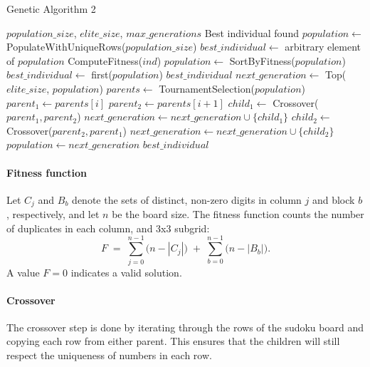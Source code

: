 \begin{algorithm}[H]
\caption{Genetic Algorithm 2}\label{alg:impl-2}
\begin{algorithmic}
\Require $population\_size$, $elite\_size$, $max\_generations$
\Ensure Best individual found
\State $population \gets$ PopulateWithUniqueRows($population\_size$)
\State $best\_individual \gets$ arbitrary element of $population$
    \State ComputeFitness($ind$)
  \EndFor
  \State $population \gets$ SortByFitness($population$) 
    \State $best\_individual \gets$ first($population$)
  \EndIf
    \State \Return $best\_individual$
  \EndIf
  \State $next\_generation \gets$ Top($elite\_size$, $population$)
  \State $parents \gets$ TournamentSelection($population$)
    \State $parent_1 \gets parents[i]$
    \State $parent_2 \gets parents[i+1]$
    \State $child_1 \gets$ Crossover($parent_1, parent_2$)
    \State $next\_generation \gets next\_generation \cup \{child_1\}$
      \State $child_2 \gets$ Crossover($parent_2, parent_1$)
      \State $next\_generation \gets next\_generation \cup \{child_2\}$
    \EndIf
  \EndFor
  \State $population \gets next\_generation$
\EndFor
\State \Return $best\_individual$
\end{algorithmic}
\end{algorithm}

\paragraph{Fitness function} Let \(C_j\) and \(B_b\) denote the sets of distinct, non-zero digits in column \(j\) and block \(b\), respectively, and let \(n\) be the board size. The fitness function counts the number of duplicates in each column, and 3x3 subgrid:
\[
F \;=\; \sum_{j=0}^{n-1} \bigl(n - |C_j|\bigr) \;+\; \sum_{b=0}^{n-1} \bigl(n - |B_b|\bigr).
\]
A value \(F=0\) indicates a valid solution.

\paragraph{Crossover} The crossover step is done by iterating through the rows of the sudoku board and copying each row from either parent. This ensures that the children will still respect the uniqueness of numbers in each row.

